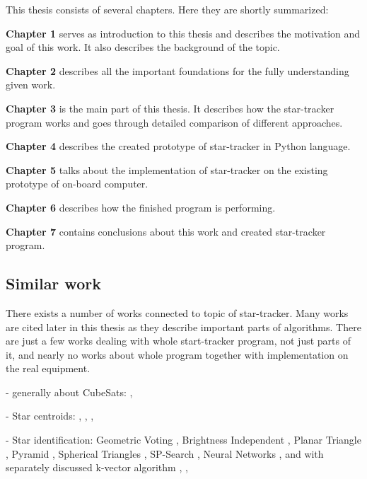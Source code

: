 \documentclass[12pt,a4paper,oneside]{article}
\begin{document}
This thesis consists of several chapters. Here they are shortly summarized:\par
\setlength{\parindent}{0cm}
\textbf{Chapter 1} serves as introduction to this thesis and describes the motivation and goal of this work. It also describes the background of the topic.\par
\textbf{Chapter 2} describes all the important foundations for the fully understanding given work.\par
\textbf{Chapter 3} is the main part of this thesis. It describes how the star-tracker program works and goes through detailed comparison of different approaches.\par
\textbf{Chapter 4} describes the created prototype of star-tracker in Python language.\par
\textbf{Chapter 5} talks about the implementation of star-tracker on the existing prototype of on-board computer.\par
\textbf{Chapter 6} describes how the finished program is performing.\par
\textbf{Chapter 7} contains conclusions about this work and created star-tracker program.\par

\setlength{\parindent}{1cm}

\subsection{Similar work}

There exists a number of works connected to topic of star-tracker. Many works are cited later in this thesis as they describe important parts of algorithms. There are just a few works dealing with whole start-tracker program, not just parts of it, and nearly no works about whole program together with implementation on the real equipment.

- generally about CubeSats: \citep{swartwout2011brief}, \citep{heidt2000cubesat}

- Star centroids: \citep{liebe2002accuracy}, \citep{samaan2002predictive}, \citep{knutson2012fast}, \citep{azizabadi2014vlsi}

- Star identification: Geometric Voting \citep{kolomenkin2008geometric}, Brightness Independent \citep{dong2006brightness}, Planar Triangle \citep{cole2006fast}, Pyramid \citep{mortari2004pyramid}, Spherical Triangles \citep{cole2004fast}, SP-Search \cite{mortari1999sp}, Neural Networks \citep{miri2012star}, \cite{lindbladstar} and \citep{li2003star} with separately discussed k-vector algorithm \citep{mortari1996fast}, \citep{mortari2000k}, \citep{mortari2013k}
\end{document}
